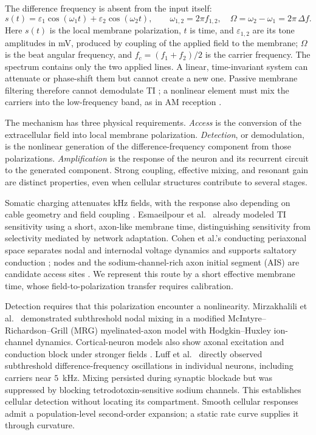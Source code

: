 \documentclass[11pt,a4paper]{article}
\begin{document}
The difference frequency is absent from the input itself:
\begin{equation}
s(t)=\varepsilon_1\cos(\omega_1 t)+\varepsilon_2\cos(\omega_2 t),\qquad
\omega_{1,2}=2\pi f_{1,2},\quad \Omega=\omega_2-\omega_1=2\pi\,\Delta f .
\label{eq:am}
\end{equation}
Here $s(t)$ is the local membrane polarization, $t$ is time, and
$\varepsilon_{1,2}$ are its tone amplitudes in mV, produced by coupling of the applied field to the membrane; $\Omega$ is the beat angular frequency, and
$f_c=(f_1+f_2)/2$ is the carrier frequency. The spectrum contains only the two applied lines. A linear, time-invariant system can attenuate or phase-shift
them but cannot create a new one. Passive membrane filtering therefore cannot
demodulate TI \cite{mirzakhalili2020}; a nonlinear element must mix the carriers into
the low-frequency band, as in AM reception \cite{nahin2001}.

The mechanism has three physical requirements.
\emph{Access} is the conversion of the extracellular field into local membrane
polarization. \emph{Detection}, or demodulation, is the nonlinear generation of the
difference-frequency component from those polarizations. \emph{Amplification} is
the response of the neuron and its recurrent circuit to the generated component.
Strong coupling, effective mixing, and resonant gain are distinct properties,
even when cellular structures contribute to several stages.

Somatic charging attenuates kHz fields, with the response also depending on cable
geometry and field coupling \cite{deitcher2017,eyal2016}. Esmaeilpour et al.\
\cite{esmaeilpour2021} already modeled TI sensitivity using a short, axon-like
membrane time, distinguishing sensitivity from selectivity mediated by
network adaptation. Cohen et al.'s conducting periaxonal space separates nodal and
internodal voltage dynamics and supports saltatory conduction
\cite{cohen2020periaxonal}; nodes and the sodium-channel-rich axon initial segment
(AIS) are candidate access sites \cite{kole2008ais}. We represent this route by a
short effective membrane time, whose field-to-polarization transfer requires
calibration.

Detection requires that this polarization encounter a nonlinearity. Mirzakhalili
et al.\ \cite{mirzakhalili2020} demonstrated subthreshold nodal mixing in a modified
McIntyre--\allowbreak Richardson--\allowbreak Grill (MRG) myelinated-axon model
with Hodgkin--Huxley ion-channel dynamics. Cortical-neuron models also
show axonal excitation and conduction block under stronger fields \cite{wang2023}.
Luff et al.\ \cite{luff2024mixer} directly observed subthreshold difference-frequency
oscillations in individual neurons, including carriers near $5$~kHz. Mixing persisted
during synaptic blockade but was suppressed by blocking tetrodotoxin-sensitive sodium
channels. This establishes cellular detection without locating its compartment. Smooth
cellular responses admit a population-level second-order expansion; a static
rate curve supplies it through curvature.
\end{document}
